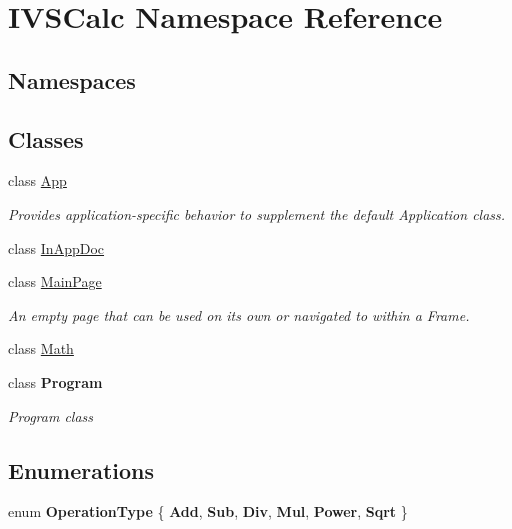 \hypertarget{namespace_i_v_s_calc}{}\section{I\+V\+S\+Calc Namespace Reference}
\label{namespace_i_v_s_calc}
\subsection*{Namespaces}
\begin{DoxyCompactItemize}
\end{DoxyCompactItemize}
\subsection*{Classes}
\begin{DoxyCompactItemize}
\item 
class \hyperlink{class_i_v_s_calc_1_1_app}{App}
\begin{DoxyCompactList}\small\item\em Provides application-\/specific behavior to supplement the default Application class. \end{DoxyCompactList}\item 
class \hyperlink{class_i_v_s_calc_1_1_in_app_doc}{In\+App\+Doc}
\item 
class \hyperlink{class_i_v_s_calc_1_1_main_page}{Main\+Page}
\begin{DoxyCompactList}\small\item\em An empty page that can be used on its own or navigated to within a Frame. \end{DoxyCompactList}\item 
class \hyperlink{class_i_v_s_calc_1_1_math}{Math}
\item 
class {\bfseries Program}
\begin{DoxyCompactList}\small\item\em Program class \end{DoxyCompactList}\end{DoxyCompactItemize}
\subsection*{Enumerations}
\begin{DoxyCompactItemize}
\item 
\mbox{\label{namespace_i_v_s_calc_a10458999dddc1d2b5df304ccee5ec5b9}} 
enum {\bfseries Operation\+Type} \{ \newline
{\bfseries Add}, 
{\bfseries Sub}, 
{\bfseries Div}, 
{\bfseries Mul}, 
\newline
{\bfseries Power}, 
{\bfseries Sqrt}
 \}
\end{DoxyCompactItemize}
